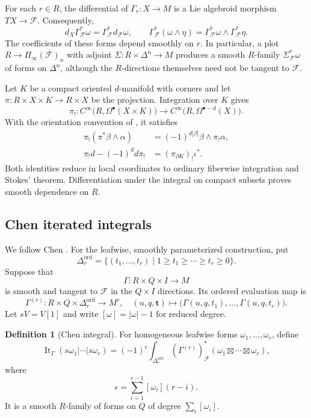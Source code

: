 \documentclass[12pt]{amsart}
\theoremstyle{definition}
\newtheorem{defn}[thm]{Definition}
\theoremstyle{remark}
\numberwithin{equation}{section}
\newcommand{\CF}{{\mathcal F}}
\newcommand{\1}{{\mathbb{1}}}
\begin{document}
For each $r\in R$, the differential of $\Gamma_r:X\to M$ is a Lie
algebroid morphism $TX\to\CF$.  Consequently,
\begin{equation}\label{eq:vertical-pullback}
 d_X\Gamma_{\CF}^*\omega
 =\Gamma_{\CF}^*d_{\CF}\omega,
 \qquad
 \Gamma_{\CF}^*(\omega\wedge\eta)
 =\Gamma_{\CF}^*\omega\wedge\Gamma_{\CF}^*\eta.
\end{equation}
The coefficients of these forms depend smoothly on $r$.  In
particular, a plot $R\to\Pi_\infty(\CF)_n$ with adjoint
$\Sigma:R\times\Delta^n\to M$ produces a smooth $R$-family
$\Sigma_{\CF}^*\omega$ of forms on $\Delta^n$, although the
$R$-directions themselves need not be tangent to $\CF$.

Let $K$ be a compact oriented $d$-manifold with corners and let
$\pi:R\times X\times K\to R\times X$ be the projection.  Integration
over $K$ gives
\[
 \pi_!:
 C^\infty\bigl(R,\Omega^\bullet(X\times K)\bigr)
 \longrightarrow
 C^\infty\bigl(R,\Omega^{\bullet-d}(X)\bigr).
\]
With the orientation convention of \cite[Section 3.2]{AS12}, it
satisfies
\begin{align}
 \pi_!(\pi^*\beta\wedge\alpha)
 &=
 (-1)^{d|\beta|}\beta\wedge\pi_!\alpha,
 \label{eq:fiber-module}\\
 \pi_!d-(-1)^d d\pi_!
 &=
 (\pi_{\partial K})_!\iota^*.
 \label{eq:fiber-stokes}
\end{align}
Both identities reduce in local coordinates to ordinary fiberwise
integration and Stokes' theorem.  Differentiation under the integral on
compact subsets proves smooth dependence on $R$.

\subsection{Chen iterated integrals}

We follow Chen \cite{Che77}.  For the leafwise, smoothly parameterized
construction, put
\[
 \Delta_r^{\mathrm{ord}}
 =
 \{(t_1,\ldots,t_r)\mid
 1\geq t_1\geq\cdots\geq t_r\geq0\}.
\]
Suppose that
\[
 \Gamma:R\times Q\times I\longrightarrow M
\]
is smooth and tangent to $\CF$ in the $Q\times I$ directions.  Its
ordered evaluation map is
\[
 \Gamma^{(r)}:
 R\times Q\times\Delta_r^{\mathrm{ord}}\longrightarrow M^r,
 \quad
 (u,q,\mathbf t)\longmapsto
 \bigl(\Gamma(u,q,t_1),\ldots,\Gamma(u,q,t_r)\bigr).
\]
Let $sV=V[1]$ and write $[\omega]=|\omega|-1$ for reduced degree.

\begin{defn}[Chen integral]\label{def:chen}
For homogeneous leafwise forms $\omega_1,\ldots,\omega_r$, define
\[
 \operatorname{It}_{\Gamma}
 (s\omega_1|\cdots|s\omega_r)
 =
 (-1)^{\epsilon}
 \int_{\Delta_r^{\mathrm{ord}}}
 (\Gamma^{(r)})_{\CF}^*
 (\omega_1\boxtimes\cdots\boxtimes\omega_r),
\]
where
\[
 \epsilon=\sum_{i=1}^{r-1}[\omega_i](r-i).
\]
It is a smooth $R$-family of forms on $Q$ of degree
$\sum_i[\omega_i]$.
\end{defn}
\end{document}
